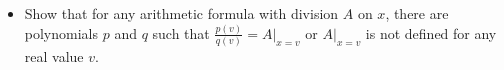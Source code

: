 \begin{chapterendexercises}
\begin{itemize}
            \item Show that for any arithmetic formula with division $A$ on $x$,
                there are polynomials $p$ and $q$ such that $\frac{p(v)}{q(v)} =
                A\big\rvert_{x = v}$ or $A\big\rvert_{x = v}$ is not defined for
                any real value $v$.
        \end{itemize}
\end{chapterendexercises}

